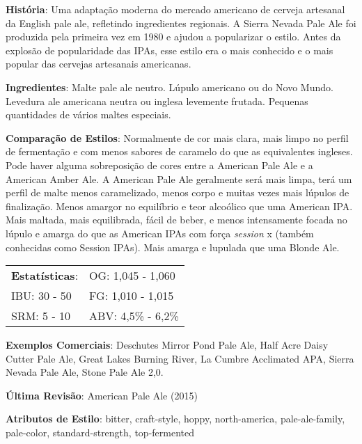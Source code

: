 \textbf{História}: Uma adaptação moderna do mercado americano de cerveja artesanal da English pale ale, refletindo ingredientes regionais. A Sierra Nevada Pale Ale foi produzida pela primeira vez em 1980 e ajudou a popularizar o estilo. Antes da explosão de popularidade das IPAs, esse estilo era o mais conhecido e o mais popular das cervejas artesanais americanas.

\textbf{Ingredientes}: Malte pale ale neutro. Lúpulo americano ou do Novo Mundo. Levedura ale americana neutra ou inglesa levemente frutada. Pequenas quantidades de vários maltes especiais.

\textbf{Comparação de Estilos}: Normalmente de cor mais clara, mais limpo no perfil de fermentação e com menos sabores de caramelo do que as equivalentes ingleses. Pode haver alguma sobreposição de cores entre a American Pale Ale e a American Amber Ale. A American Pale Ale geralmente será mais limpa, terá um perfil de malte menos caramelizado, menos corpo e muitas vezes mais lúpulos de finalização. Menos amargor no equilíbrio e teor alcoólico que uma American IPA. Mais maltada, mais equilibrada, fácil de beber, e menos intensamente focada no lúpulo e amarga do que as American IPAs com força \textit{session} x  (também conhecidas como Session IPAs). Mais amarga e lupulada que uma Blonde Ale.

\begin{tabular}{@{}p{35mm}p{35mm}@{}}
  \textbf{Estatísticas}: & OG: 1,045 - 1,060 \\
  IBU: 30 - 50  & FG: 1,010 - 1,015  \\
  SRM: 5 - 10  & ABV: 4,5\% - 6,2\%
\end{tabular}

\textbf{Exemplos Comerciais}: Deschutes Mirror Pond Pale Ale, Half Acre Daisy Cutter Pale Ale, Great Lakes Burning River, La Cumbre Acclimated APA, Sierra Nevada Pale Ale, Stone Pale Ale 2,0.

\textbf{Última Revisão}: American Pale Ale (2015)

\textbf{Atributos de Estilo}: bitter, craft-style, hoppy, north-america, pale-ale-family, pale-color, standard-strength, top-fermented
